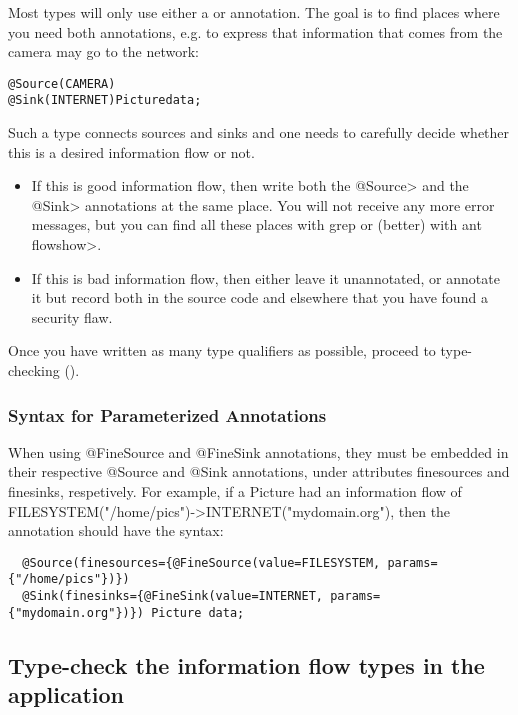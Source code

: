 Most types will only use either a \srcsome or \sinksome
annotation.
The goal is to find places where you need both annotations, e.g. to
express that information that comes from the camera may go to the
network:

\begin{alltt}
    @Source(CAMERA)
    @Sink(INTERNET) Picture data;
\end{alltt}

Such a type connects sources and sinks and one needs to carefully
decide whether this is a desired information flow or not.
\begin{itemize}
\item If this is good information flow, then write both the \<@Source>
  and the \<@Sink> annotations at the same place. You will not
  receive any more error messages, but you can find all these places
  with grep or (better) with \<ant flowshow>.
\item If this is bad information flow, then either leave it unannotated,
  or annotate it but record both in the source code and elsewhere that
  you have found a security flaw.
\end{itemize}


Once you have written as many type qualifiers as possible, proceed to
type-checking ().

\subsubsection{Syntax for Parameterized Annotations\label{sec:parameterized-syntax}}
When using @FineSource and @FineSink annotations, they must be embedded in their
respective @Source and @Sink annotations, under attributes finesources and finesinks, respetively.
For example, if a Picture had an information flow of FILESYSTEM("/home/pics")->INTERNET("mydomain.org"),
then the annotation should have the syntax:

\begin{Verbatim}
  @Source(finesources={@FineSource(value=FILESYSTEM, params={"/home/pics"})})
  @Sink(finesinks={@FineSink(value=INTERNET, params={"mydomain.org"})}) Picture data;
\end{Verbatim}

\subsection{Type-check the information flow types in the application\label{sec:run-type-checker}}

